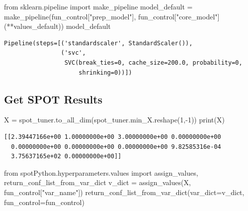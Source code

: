 \documentclass[
  letterpaper,
  DIV=11,
  numbers=noendperiod]{scrreprt}
\newenvironment{Shaded}{\begin{snugshade}}{\end{snugshade}}
\newcommand{\BuiltInTok}[1]{\textcolor[rgb]{0.00,0.23,0.31}{#1}}
\newcommand{\DecValTok}[1]{\textcolor[rgb]{0.68,0.00,0.00}{#1}}
\newcommand{\ImportTok}[1]{\textcolor[rgb]{0.00,0.46,0.62}{#1}}
\newcommand{\NormalTok}[1]{\textcolor[rgb]{0.00,0.23,0.31}{#1}}
\newcommand{\OperatorTok}[1]{\textcolor[rgb]{0.37,0.37,0.37}{#1}}
\newcommand{\StringTok}[1]{\textcolor[rgb]{0.13,0.47,0.30}{#1}}
\begin{document}
\begin{Shaded}
\begin{Highlighting}[]
\ImportTok{from}\NormalTok{ sklearn.pipeline }\ImportTok{import}\NormalTok{ make\_pipeline}
\NormalTok{model\_default }\OperatorTok{=}\NormalTok{ make\_pipeline(fun\_control[}\StringTok{"prep\_model"}\NormalTok{], fun\_control[}\StringTok{"core\_model"}\NormalTok{](}\OperatorTok{**}\NormalTok{values\_default))}
\NormalTok{model\_default}
\end{Highlighting}
\end{Shaded}

\begin{verbatim}
Pipeline(steps=[('standardscaler', StandardScaler()),
                ('svc',
                 SVC(break_ties=0, cache_size=200.0, probability=0,
                     shrinking=0))])
\end{verbatim}

\hypertarget{get-spot-results}{%
\subsection{Get SPOT Results}\label{get-spot-results}}

\begin{Shaded}
\begin{Highlighting}[]
\NormalTok{X }\OperatorTok{=}\NormalTok{ spot\_tuner.to\_all\_dim(spot\_tuner.min\_X.reshape(}\DecValTok{1}\NormalTok{,}\OperatorTok{{-}}\DecValTok{1}\NormalTok{))}
\BuiltInTok{print}\NormalTok{(X)}
\end{Highlighting}
\end{Shaded}

\begin{verbatim}
[[2.39447166e+00 1.00000000e+00 3.00000000e+00 0.00000000e+00
  0.00000000e+00 0.00000000e+00 0.00000000e+00 9.82585316e-04
  3.75637165e+02 0.00000000e+00]]
\end{verbatim}

\begin{Shaded}
\begin{Highlighting}[]
\ImportTok{from}\NormalTok{ spotPython.hyperparameters.values }\ImportTok{import}\NormalTok{ assign\_values, return\_conf\_list\_from\_var\_dict}
\NormalTok{v\_dict }\OperatorTok{=}\NormalTok{ assign\_values(X, fun\_control[}\StringTok{"var\_name"}\NormalTok{])}
\NormalTok{return\_conf\_list\_from\_var\_dict(var\_dict}\OperatorTok{=}\NormalTok{v\_dict, fun\_control}\OperatorTok{=}\NormalTok{fun\_control)}
\end{Highlighting}
\end{Shaded}
\end{document}
